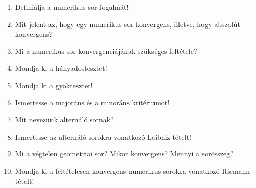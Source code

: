 \vfill
\begin{questions}[section.4.2]
  \begin{enumerate}
    \item Definiálja a numerikus sor fogalmát!
    \item Mit jelent az, hogy egy numerikus sor konvergens, illetve, hogy
          abszolút konvergens?
    \item Mi a numerikus sor konvergenciájának szükséges feltétele?
    \item Mondja ki a hányadostesztet!
    \item Mondja ki a gyöktesztet!
    \item Ismertesse a majoráns és a minoráns kritériumot!
    \item Mit nevezünk alternáló sornak?
    \item Ismertesse az alternáló sorokra vonatkozó Leibniz-tételt!
    \item Mi a végtelen geometriai sor? Mikor konvergens? Mennyi a sorösszeg?
    \item Mondja ki a feltételesen konvergens numerikus sorokra vonatkozó
          Riemann-tételt!
  \end{enumerate}
\end{questions}